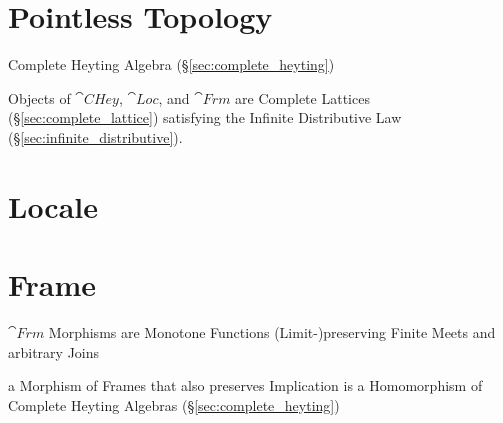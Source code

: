 \section{Pointless Topology}\label{sec:pointless_topology}

Complete Heyting Algebra (\S\ref{sec:complete_heyting})

Objects of $\cat{CHey}$, $\cat{Loc}$, and $\cat{Frm}$ are Complete
Lattices (\S\ref{sec:complete_lattice}) satisfying the Infinite
Distributive Law (\S\ref{sec:infinite_distributive}).



\section{Locale}\label{sec:locale}

\section{Frame}\label{sec:frame}

$\cat{Frm}$ Morphisms are Monotone Functions (Limit-)preserving Finite
Meets and arbitrary Joins

a Morphism of Frames that also preserves Implication is a Homomorphism
of Complete Heyting Algebras (\S\ref{sec:complete_heyting})
